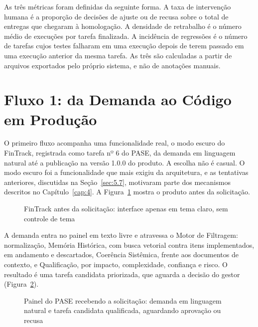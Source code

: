 As três métricas foram definidas da seguinte forma. A taxa de intervenção humana é a proporção de decisões de ajuste ou de recusa sobre o total de entregas que chegaram à homologação. A densidade de retrabalho é o número médio de execuções por tarefa finalizada. A incidência de regressões é o número de tarefas cujos testes falharam em uma execução depois de terem passado em uma execução anterior da mesma tarefa. As três são calculadas a partir de arquivos exportados pelo próprio sistema, e não de anotações manuais.

\section{Fluxo 1: da Demanda ao Código em Produção}\label{sec:5.4}

O primeiro fluxo acompanha uma funcionalidade real, o modo escuro do FinTrack, registrada como tarefa nº 6 do PASE, da demanda em linguagem natural até a publicação na versão 1.0.0 do produto. A escolha não é casual. O modo escuro foi a funcionalidade que mais exigiu da arquitetura, e as tentativas anteriores, discutidas na Seção~\ref{sec:5.7}, motivaram parte dos mecanismos descritos no Capítulo~\ref{cap:4}. A Figura~\ref{fig:11} mostra o produto antes da solicitação.

\begin{figure}[htb]
\centering
\caption{FinTrack antes da solicitação: interface apenas em tema claro, sem controle de tema}
\label{fig:11}
\end{figure}

A demanda entra no painel em texto livre e atravessa o Motor de Filtragem: normalização, Memória Histórica, com busca vetorial contra itens implementados, em andamento e descartados, Coerência Sistêmica, frente aos documentos de contexto, e Qualificação, por impacto, complexidade, confiança e risco. O resultado é uma tarefa candidata priorizada, que aguarda a decisão do gestor (Figura~\ref{fig:12}).

\begin{figure}[htb]
\centering
\caption{Painel do PASE recebendo a solicitação: demanda em linguagem natural e tarefa candidata qualificada, aguardando aprovação ou recusa}
\label{fig:12}
\end{figure}

